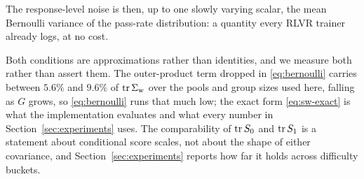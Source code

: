 The response-level noise is then, up to one slowly varying scalar, the mean Bernoulli variance of
the pass-rate distribution: a quantity every RLVR trainer already logs, at no cost.

Both conditions are approximations rather than identities, and we measure both rather than assert
them. The outer-product term dropped in \eqref{eq:bernoulli} carries between $5.6\%$ and $9.6\%$ of
$\operatorname{tr}\Sigma_{\mathrm{w}}$ over the pools and group sizes used here, falling as $G$ grows, so \eqref{eq:bernoulli}
runs that much low; the exact form \eqref{eq:sw-exact} is what the implementation evaluates and what
every number in Section~\ref{sec:experiments} uses. The comparability of $\operatorname{tr} S_0$ and $\operatorname{tr} S_1$ is
a statement about conditional score scales, not about the shape of either covariance, and
Section~\ref{sec:experiments} reports how far it holds across difficulty buckets.
